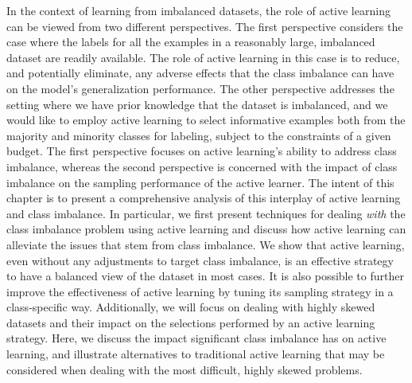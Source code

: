 In the context of learning from imbalanced datasets, the role of active learning can be viewed from two different perspectives. The first perspective considers the case where the labels for all the examples in a reasonably large, imbalanced dataset are readily available. The role of active learning in this case is to reduce, and potentially eliminate, any adverse effects that the class imbalance can have on the model's generalization performance. The other perspective addresses the setting where we have prior knowledge that the dataset is imbalanced, and we would like to employ active learning to select  informative examples both from the majority and minority classes for labeling, subject to the constraints of a given budget. The first perspective focuses on active learning's ability to address class imbalance, whereas the second perspective is concerned with the impact of class imbalance on the sampling performance of the active learner. The intent of this chapter is to present a comprehensive analysis of this interplay of active learning and class imbalance. In particular, we first present techniques for dealing \textit{with} the class imbalance problem using active learning and discuss how active learning can alleviate the issues that stem from class imbalance. We show that active learning, even without any adjustments to target class imbalance, is an effective strategy to have a balanced view of the dataset in most cases. It is also possible to further improve the  effectiveness of active learning by tuning its sampling strategy in a class-specific way. Additionally, we will focus on dealing with highly skewed datasets and their impact on the selections performed by an active learning strategy.  Here, we discuss the impact  significant class imbalance has on active learning, and illustrate alternatives to traditional active learning that may be considered when dealing with the most difficult, highly skewed problems.

